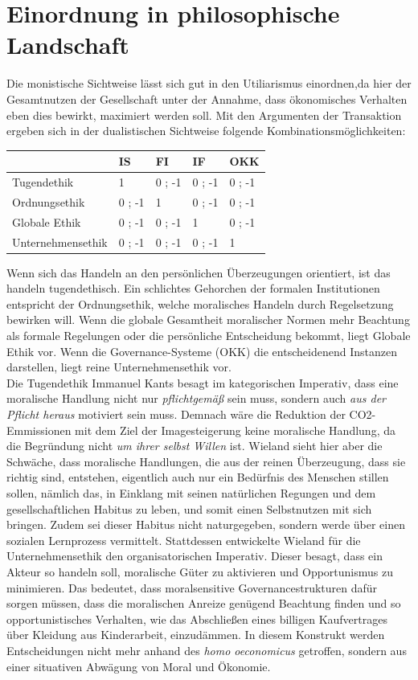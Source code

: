 \documentclass[12pt]{article}
\begin{document}
\section{Einordnung in philosophische Landschaft}
Die monistische Sichtweise lässt sich gut in den Utiliarismus einordnen,da hier der Gesamtnutzen der Gesellschaft unter der Annahme, dass ökonomisches Verhalten eben dies bewirkt, maximiert werden soll. Mit den Argumenten der Transaktion ergeben sich in der dualistischen Sichtweise folgende Kombinationsmöglichkeiten:
\begin{center}
\begin{tabular}{|p{4cm}|p{2cm}|p{2cm}|p{2cm}|p{2cm}|}
\hline
 { } & IS & FI & IF & OKK\\\hline
 Tugendethik & 1 & 0 ; -1 & 0 ; -1 & 0 ; -1\\\hline
 Ordnungsethik & 0 ; -1 & 1 & 0 ; -1 & 0 ; -1\\\hline
 Globale Ethik & 0 ; -1 & 0 ; -1 & 1 & 0 ; -1\\\hline
 Unternehmensethik & 0 ; -1 & 0 ; -1 & 0 ; -1 & 1\\\hline
\end{tabular}
\end{center}
Wenn sich das Handeln an den persönlichen Überzeugungen orientiert, ist das handeln tugendethisch. Ein schlichtes Gehorchen der formalen Institutionen entspricht der Ordnungsethik, welche moralisches Handeln durch Regelsetzung bewirken will. Wenn die globale Gesamtheit moralischer Normen mehr Beachtung als formale Regelungen oder die persönliche Entscheidung bekommt, liegt Globale Ethik vor. Wenn die Governance-Systeme (OKK) die entscheidenend Instanzen darstellen, liegt reine Unternehmensethik vor.\\
Die Tugendethik Immanuel Kants besagt im kategorischen Imperativ, dass eine moralische Handlung nicht nur \textit{pflichtgemäß} sein muss, sondern auch \textit{aus der Pflicht heraus} motiviert sein muss. Demnach wäre die Reduktion der CO2-Emmissionen mit dem Ziel der Imagesteigerung keine moralische Handlung, da die Begründung nicht \textit{um ihrer selbst Willen} ist. Wieland sieht hier aber die Schwäche, dass moralische Handlungen, die aus der reinen Überzeugung, dass sie richtig sind, entstehen, eigentlich auch nur ein Bedürfnis des Menschen stillen sollen, nämlich das, in Einklang mit seinen natürlichen Regungen und dem gesellschaftlichen Habitus zu leben, und somit einen Selbstnutzen mit sich bringen. Zudem sei dieser Habitus nicht naturgegeben, sondern werde über einen sozialen Lernprozess vermittelt. Stattdessen entwickelte Wieland für die Unternehmensethik den organisatorischen Imperativ. Dieser besagt, dass ein Akteur so handeln soll, moralische Güter zu aktivieren und Opportunismus zu minimieren. Das bedeutet, dass moralsensitive Governancestrukturen dafür sorgen müssen, dass die moralischen Anreize genügend Beachtung finden und so opportunistisches Verhalten, wie das Abschließen eines billigen Kaufvertrages über Kleidung aus Kinderarbeit, einzudämmen. In diesem Konstrukt werden Entscheidungen nicht mehr anhand des \textit{homo oeconomicus} getroffen, sondern aus einer situativen Abwägung von Moral und Ökonomie.
\end{document}
